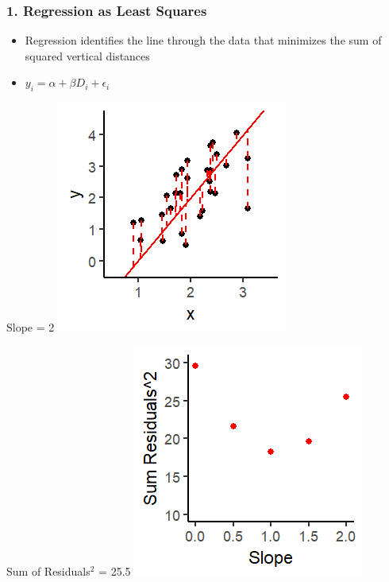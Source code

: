 \documentclass[xcolor=x11names,compress]{beamer}\usepackage[]{graphicx}\usepackage[]{color}
\makeatletter
\def\maxwidth{ %
  \ifdim\Gin@nat@width>\linewidth
    \linewidth
  \else
    \Gin@nat@width
  \fi
}
\newenvironment{knitrout}{}{} %
\renewcommand{\(}{\begin{columns}}
\renewcommand{\)}{\end{columns}}
\newcommand{\<}[1]{\begin{column}{#1}}
\renewcommand{\>}{\end{column}}
\makeatother
\begin{document}
\begin{frame}
\frametitle{1. Regression as Least Squares}
\begin{itemize}
\item Regression identifies the line through the data that minimizes the sum of squared vertical distances 
\item $y_i = \alpha + \beta D_i + \epsilon_i$
\end{itemize}
\begin{multicols}{2}
Slope = 2
\begin{knitrout}
\color{fgcolor}
\includegraphics[width=\maxwidth]{figure/graph_ols5-1} 

\end{knitrout}
\columnbreak
Sum of Residuals$^2$ = 25.5
\begin{knitrout}
\color{fgcolor}
\includegraphics[width=\maxwidth]{figure/graph_ssr5-1} 

\end{knitrout}
\end{multicols}
\end{frame}
\end{document}
